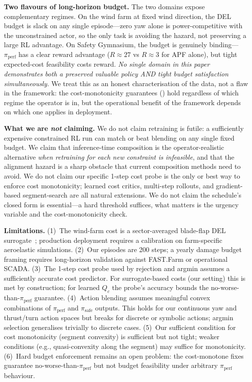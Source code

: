 \documentclass{article}
\begin{document}
\textbf{Two flavours of long-horizon budget.}
The two domains expose complementary regimes.
On the wind farm at fixed wind direction, the DEL budget is slack on any single episode---zero yaw alone is power-competitive with the unconstrained actor, so the only task is avoiding the hazard, not preserving a large RL advantage.
On Safety Gymnasium, the budget is genuinely binding---$\pi_{\mathrm{perf}}$ has a clear reward advantage ($R\!\approx\!27$ vs $R\!\approx\!3$ for APF alone), but tight expected-cost feasibility costs reward.
\emph{No single domain in this paper demonstrates both a preserved valuable policy AND tight budget satisfaction simultaneously.}
We treat this as an honest characterisation of the data, not a flaw in the framework: the cost-monotonicity guarantees () hold regardless of which regime the operator is in, but the operational benefit of the framework depends on which one applies in deployment.

\textbf{What we are \emph{not} claiming.}
We do not claim retraining is futile: a sufficiently expensive constrained RL run can match or beat blending on any single fixed budget.
We claim that inference-time composition is the operator-realistic alternative \emph{when retraining for each new constraint is infeasible}, and that the alignment hazard is a sharp obstacle that current composition methods need to avoid.
We do not claim our specific 1-step cost probe is the only or best way to enforce cost monotonicity; learned cost critics, multi-step rollouts, and gradient-based segment-search are all natural extensions.
We do not claim the schedule's closed form is essential---a hard threshold suffices, what matters is the urgency variable and the cost-monotonicity check.

\textbf{Limitations.}
(1)~The wind-farm cost is a sector-averaged blade-flap DEL surrogate~\citep{guillore2024sectoravg}; production deployment requires a calibration on farm-specific aeroelastic simulations.
(2)~Our episodes are 200 steps; a yearly damage budget framing requires long-horizon validation against FAST.Farm or operational SCADA.
(3)~The 1-step cost probe used by rejection and argmin assumes a sufficiently accurate cost predictor.
For surrogate-based costs (our setting) this is met by construction; for learned $Q_c$ the probe's accuracy bounds the no-worse-than-$\pi_{\mathrm{perf}}$ guarantee.
(4)~Action blending assumes meaningful convex combinations of $\pi_{\mathrm{perf}}$ and $\pi_{\mathrm{safe}}$ outputs.
This holds for our continuous yaw and thrust/turn action spaces but breaks for discrete or symbolic actions; argmin selection generalises trivially to discrete cases.
(5)~Our sufficient condition for cost monotonicity (segment convexity) is sufficient but not tight; weaker conditions (e.g., quasi-convexity along the segment) may suffice for monotonicity.
(6)~Hard budget enforcement remains an open problem: the cost-monotone fixes guarantee no-worse-than-$\pi_{\mathrm{perf}}$ but not budget feasibility under arbitrary $\pi_{\mathrm{perf}}$ behaviour.
\end{document}
